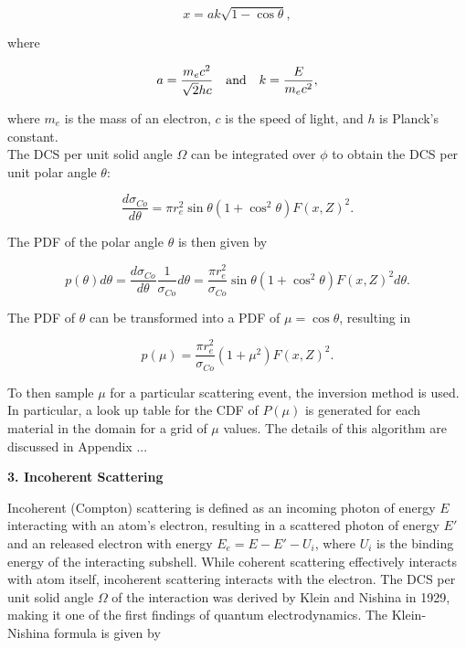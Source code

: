 \documentclass[%
 aip,
cp,  %
 amsmath,amssymb,%
reprint,%
]{revtex4-2}
\begin{document}
\begin{equation}
    x = ak\sqrt{1 - \cos\theta},
\end{equation}

where

\begin{align}
    a = \frac{m_e c^2}{\sqrt{2}hc} && \rm{and} && k = \frac{E}{m_e c^2},
\end{align}

where $m_e$ is the mass of an electron, $c$ is the speed of light, and $h$ is Planck's constant. \\

The DCS per unit solid angle $\Omega$ can be integrated over $\phi$ to obtain the DCS per unit polar angle $\theta$:


\begin{equation}
    \frac{d\sigma_{Co}}{d\theta} = \pi r_e^2 \sin \theta (1 + \cos^2 \theta) F(x, Z)^2.
\end{equation}

\par The PDF of the polar angle $\theta$ is then given by

\begin{equation}
    p(\theta) d\theta = \frac{d\sigma_{Co}}{d\theta} \frac{1}{\sigma_{Co}} d\theta = \frac{\pi r_e^2}{\sigma_{Co}} \sin \theta (1 + \cos^2 \theta) F(x, Z)^2 d \theta.
\end{equation}

\par The PDF of $\theta$ can be transformed into a PDF of $\mu = \cos \theta$, resulting in

\begin{equation}
    p(\mu) = \frac{\pi r_e^2}{\sigma_{Co}} (1 + \mu^2) F(x, Z)^2.
\end{equation}

To then sample $\mu$ for a particular scattering event, the inversion method is used. In particular, a look up table for the CDF of $P(\mu)$ is generated for each material in the domain for a grid of $\mu$ values. The details of this algorithm are discussed in Appendix ... \\

\begin{large}
    \bf{3. Incoherent Scattering}
\end{large}

\par Incoherent (Compton) scattering is defined as an incoming photon of energy $E$ interacting with an atom's electron, resulting in a scattered photon of energy $E'$ and an released electron with energy $E_e = E - E' - U_i$, where $U_i$ is the binding energy of the interacting subshell. While coherent scattering effectively interacts with atom itself, incoherent scattering interacts with the electron. The DCS per unit solid angle $\Omega$ of the interaction was derived by Klein and Nishina in 1929, making it one of the first findings of quantum electrodynamics. The Klein-Nishina formula is given by
\end{document}
